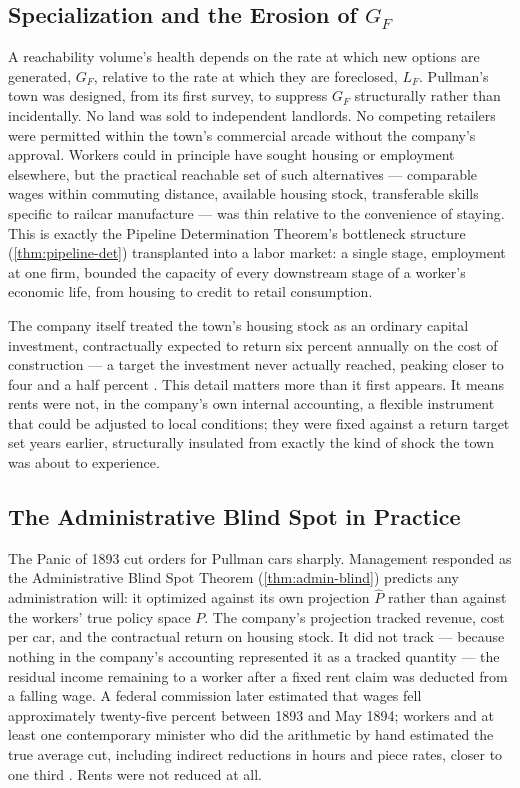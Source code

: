 \documentclass[12pt,twoside,openright]{book}
\begin{document}
\subsection{Specialization and the Erosion of $G_F$}

A reachability volume's health depends on the rate at which new
options are generated, $G_F$, relative to the rate at which they
are foreclosed, $L_F$. Pullman's town was designed, from its
first survey, to suppress $G_F$ structurally rather than
incidentally. No land was sold to independent landlords. No
competing retailers were permitted within the town's commercial
arcade without the company's approval. Workers could in
principle have sought housing or employment elsewhere, but the
practical reachable set of such alternatives --- comparable wages
within commuting distance, available housing stock, transferable
skills specific to railcar manufacture --- was thin relative to
the convenience of staying. This is exactly the Pipeline
Determination Theorem's bottleneck structure
(\cref{thm:pipeline-det}) transplanted into a labor market: a
single stage, employment at one firm, bounded the capacity of
every downstream stage of a worker's economic life, from housing
to credit to retail consumption.

The company itself treated the town's housing stock as an
ordinary capital investment, contractually expected to return six
percent annually on the cost of construction --- a target the
investment never actually reached, peaking closer to four and a
half percent \parencite{buder1967}. This detail matters more than
it first appears. It means rents were not, in the company's own
internal accounting, a flexible instrument that could be adjusted
to local conditions; they were fixed against a return target set
years earlier, structurally insulated from exactly the kind of
shock the town was about to experience.

\subsection{The Administrative Blind Spot in Practice}

The Panic of 1893 cut orders for Pullman cars sharply.
Management responded as the Administrative Blind Spot Theorem
(\cref{thm:admin-blind}) predicts any administration will: it
optimized against its own projection $\hat{P}$ rather than
against the workers' true policy space $P$. The company's
projection tracked revenue, cost per car, and the contractual
return on housing stock. It did not track --- because nothing in
the company's accounting represented it as a tracked
quantity --- the residual income remaining to a worker after a
fixed rent claim was deducted from a falling wage. A federal
commission later estimated that wages fell approximately
twenty-five percent between 1893 and May 1894; workers and at
least one contemporary minister who did the arithmetic by hand
estimated the true average cut, including indirect reductions in
hours and piece rates, closer to one third
\parencite{brecher1972}. Rents were not reduced at all.
\end{document}
